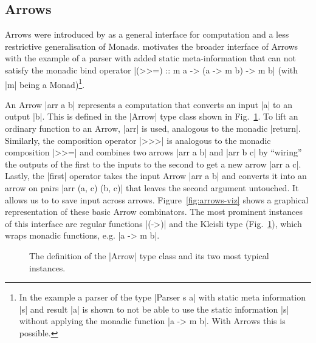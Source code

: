 \subsection{Arrows}
\label{sec:arrows}
Arrows were introduced by \citet{HughesArrows} as a general interface for computation and a less restrictive generalisation of Monads. \citeauthor{HughesArrows} motivates the broader interface of Arrows with the example of a parser with added static meta-information that can not satisfy the monadic bind operator |(>>=) :: m a -> (a -> m b) -> m b| (with |m| being a Monad)\footnote{In the example a parser of the type |Parser s a| with static meta information |s| and result |a| is shown to not be able to use the static information |s| without applying the monadic function |a -> m b|. With Arrows this is possible.}.

An Arrow |arr a b| represents a computation that converts an input |a| to an output |b|. This is defined in the |Arrow| type class shown in Fig.~\ref{fig:ArrowDefinition}.
%
To lift an ordinary function to an Arrow, |arr| is used, analogous to the monadic |return|. Similarly, the composition operator |>>>| is analogous to the monadic composition |>>=| and combines two arrows |arr a b| and |arr b c| by \enquote{wiring} the outputs of the first to the inputs to the second to get a new arrow |arr a c|. Lastly, the |first| operator takes the input Arrow |arr a b| and converts it into an arrow on pairs |arr (a, c) (b, c)| that leaves the second argument untouched. It allows us to to save input across arrows. Figure~\ref{fig:arrows-viz} shows a graphical representation of these basic Arrow combinators.
The most prominent instances of this interface are regular functions |(->)|
and the Kleisli type (Fig.~\ref{fig:ArrowDefinition}), which wraps monadic functions, e.g.  |a -> m b|.

\begin{figure}[t]
\centering
{}
\vfill
\caption{The definition of the |Arrow| type class and its two most typical instances.}
\label{fig:ArrowDefinition}
\end{figure}

